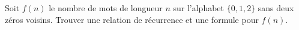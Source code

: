 Soit $f(n)$ le nombre de mots de longueur $n$ sur l'alphabet $\{0, 1, 2\}$ sans deux zéros voisins. Trouver une relation de récurrence et une formule pour $f(n)$.
